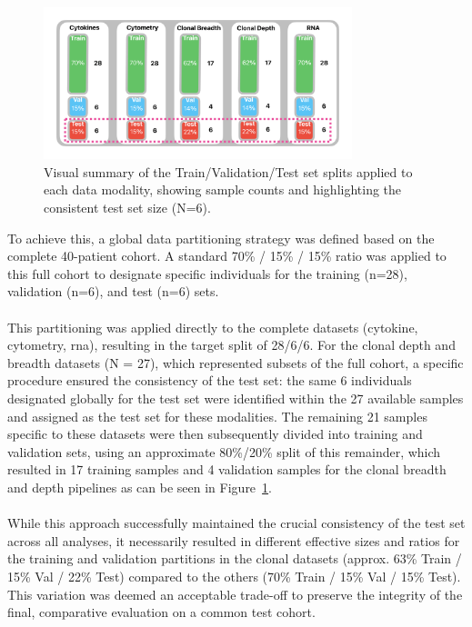 \documentclass[12pt,a4paper]{report}
\begin{document}
\begin{figure}[H]
  \centering
  \includegraphics[width=0.8\textwidth]{images/split-1.png}
    \caption[Data splits per modality]{Visual summary of the Train/Validation/Test set splits applied to each data modality, showing sample counts and highlighting the consistent test set size (N=6).}
  \label{fig:split_data}
\end{figure}
\noindent
To achieve this, a global data partitioning strategy was defined based on the complete 40-patient cohort. A standard 70\% / 15\% / 15\% ratio was applied to this full cohort to designate specific individuals for the training (n=28), validation (n=6), and test (n=6) sets.\\
\\
This partitioning was applied directly to the complete datasets (cytokine, cytometry, \acrshort{rna}), resulting in the target split of 28/6/6. For the clonal depth and breadth datasets (N = 27), which represented subsets of the full cohort, a specific procedure ensured the consistency of the test set: the same 6 individuals designated globally for the test set were identified within the 27 available samples and assigned as the test set for these modalities. The remaining 21 samples specific to these datasets were then subsequently divided into training and validation sets, using an approximate 80\%/20\% split of this remainder, which resulted in 17 training samples and 4 validation samples for the clonal breadth and depth pipelines as can be seen in Figure~\ref{fig:split_data}.\\
\\
While this approach successfully maintained the crucial consistency of the test set across all analyses, it necessarily resulted in different effective sizes and ratios for the training and validation partitions in the clonal datasets (approx. 63\% Train / 15\% Val / 22\% Test) compared to the others (70\% Train / 15\% Val / 15\% Test). This variation was deemed an acceptable trade-off to preserve the integrity of the final, comparative evaluation on a common test cohort.
\end{document}
